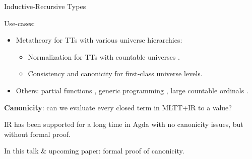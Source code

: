 \documentclass[dvipsnames,aspectratio=169]{beamer}
\begin{document}
\begin{frame}{Inductive-Recursive Types}

Use-cases:
\begin{itemize}
\item Metatheory for TTs with various universe hierarchies:
  \begin{itemize}
    \item Normalization for TTs with countable universes \cite{martin1975intuitionistic,DBLP:journals/pacmpl/0001OV18,DBLP:journals/pacmpl/PujetT23,DBLP:journals/pacmpl/AbelDE23}.
    \item Consistency \cite{first-class-univ} and canonicity \cite{DBLP:journals/corr/abs-2502-20485} for first-class universe levels.
  \end{itemize}
\item Others: partial functions \cite{DBLP:conf/tphol/BoveC01}, generic programming \cite{DBLP:journals/njc/BenkeDJ03,diehl2017fully}, large countable ordinals \cite{ir-ordinals,btb-ordinal}.
\end{itemize}
\vspace{1em}
\pause

\textbf{Canonicity}: can we evaluate every closed term in MLTT+IR to a value?
\vspace{1em}

IR has been supported for a long time in Agda with no canonicity issues,
but without formal proof.
\vspace{1em}
\pause

In this talk \& upcoming paper: formal proof of canonicity.
\end{frame}
\end{document}
